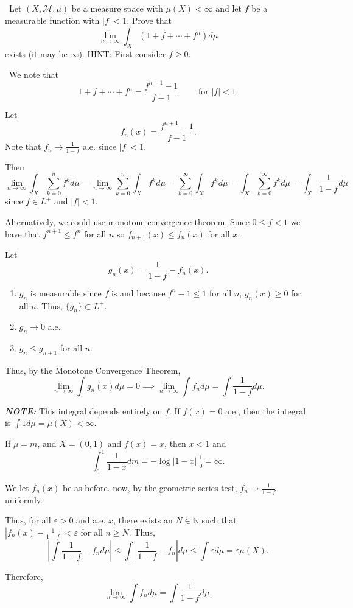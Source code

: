 \documentclass[12pt]{Qual}
\begin{document}
\begin{problem} $\,$
Let $(X,\mathscr{M},\mu)$ be a measure space with $\mu(X)<\infty$ and let $f$ be a measurable function with $|f|<1.$ Prove that $$\lim_{n\to\infty}\int_X(1+f+\cdots+f^n)d\mu$$ exists (it may be $\infty$). HINT: First consider $f\ge0$.
\end{problem}


\begin{solution}$\,$
We note that $$1+f+\cdots+f^n=\frac{f^{n+1}-1}{f-1}\qquad\text{ for }|f|<1.$$

Let $$f_n(x)=\frac{f^{n+1}-1}{f-1}.$$ Note that $f_n\to \frac{1}{1-f}$ a.e. since $|f|<1.$

 Then $$\lim_{n\to\infty}\int_X\sum_{k=0}^nf^kd\mu=\lim_{n\to\infty}\sum_{k=0}^n\int_Xf^kd\mu=\sum_{k=0}^\infty\int_Xf^kd\mu=\int_X\sum_{k=0}^\infty f^kd\mu=\int_X\frac{1}{1-f}d\mu$$ since $f\in L^+$ and $|f|<1.$

Alternatively, we could use monotone convergence theorem. Since $0\le f<1$ we have that $f^{n+1}\le f^n$ for all $n$ so $f_{n+1}(x)\le f_n(x)$ for all $x$.

Let $$g_n(x)=\frac{1}{1-f}-f_n(x).$$

\begin{enumerate}
    \item $g_n$ is measurable since $f$ is and because $f^n-1\le 1$ for all $n$, $g_n(x)\ge0$ for all $n.$ Thus, $\{g_n\}\subset L^+.$
    \item $g_n\to0$ a.e.
    \item $g_n\le g_{n+1}$ for all $n$.
\end{enumerate}

Thus, by the Monotone Convergence Theorem, $$\lim_{n\to\infty}\int g_n(x)d\mu=0\implies \lim_{n\to\infty}\int f_nd\mu=\int\frac{1}{1-f}d\mu.$$


\textbf{\textit{NOTE:}} This integral depends entirely on $f$. If $f(x)=0$ a.e., then the integral is $\int 1d\mu=\mu(X)<\infty.$

If $\mu=m$, and $X=(0,1)$ and $f(x)=x$, then $x<1$ and $$\int_0^1\frac{1}{1-x}dm=-\log|1-x|\bigg|_0^1=\infty.$$

 We let $f_n(x)$ be as before. now, by the geometric series test, $f_n\to\frac{1}{1-f}$ uniformly.

Thus, for all $\varepsilon>0$ and a.e. $x$, there exists an $N\in\mathbb{N}$ such that $|f_n(x)-\frac{1}{1-f}|<\varepsilon$ for all $n\ge N$. Thus, $$\left|\int\frac{1}{1-f}-f_nd\mu\right|\le\int\left|\frac{1}{1-f}-f_n\right|d\mu\le\int\varepsilon d\mu=\varepsilon \mu(X).$$

Therefore, $$\lim_{n\to\infty}\int f_nd\mu=\int\frac{1}{1-f}d\mu.$$
\end{solution}
\newpage
\end{document}
